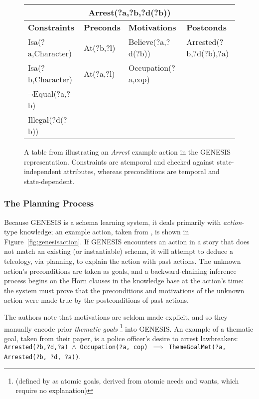 \begin{figure}
\begin{tabular}{ |p{3cm}|p{2cm}|p{3.5cm}|p{4cm}|  }
 \hline
 \multicolumn{4}{|c|}{\textbf{Arrest(?a,?b,?d(?b))}} \\
 \hline
 \textbf{Constraints}&\textbf{Preconds}&\textbf{Motivations}&\textbf{Postconds}\\
 \hline
Isa(?a,Character)&At(?b,?l)&Believe(?a,?d(?b))&Arrested(?b,?d(?b),?a)\\
Isa(?b,Character)&At(?a,?l)&Occupation(?a,cop)&\\
$\lnot$Equal(?a,?b)&&&\\
Illegal(?d(?b))&&&\\
 \hline
\end{tabular}
\caption{A table from \citep{mooney90} illustrating an \textit{Arrest} example action in the GENESIS representation. Constraints are atemporal and checked against state-independent attributes, whereas preconditions are temporal and state-dependent.}
\label{fig:genesisaction}
\end{figure}

\subsubsection{The Planning Process}

Because GENESIS is a schema learning system, it deals primarily with \textit{action}-type knowledge; an example action, taken from \citep{mooney90}, is shown in Figure~\vref{fig:genesisaction}. If GENESIS encounters an action in a story that does not match an existing (or instantiable) schema, it will attempt to deduce a teleology, via planning, to explain the action with past actions. The unknown action's preconditions are taken as goals, and a backward-chaining inference process begins on the Horn clauses in the knowledge base at the action's time: the system must prove that the preconditions and motivations of the unknown action were made true by the postconditions of past actions.

The authors note that motivations are seldom made explicit, and so they manually encode prior \textit{thematic goals} \footnote{(defined by \citep{schankandabelson} as atomic goals, derived from atomic needs and wants, which require no explanation)} into GENESIS. An example of a thematic goal, taken from their paper, is a police officer's desire to arrest lawbreakers: \texttt{Arrested(?b,?d,?a) $\land$ Occupation(?a, cop) $\implies$ ThemeGoalMet(?a, Arrested(?b, ?d, ?a))}.

